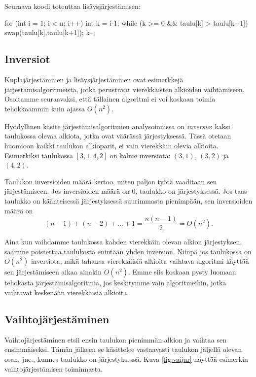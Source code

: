 Seuraava koodi toteuttaa lisäysjärjestämisen:

\begin{code}
for (int i = 1; i < n; i++) {
    int k = i-1;
    while (k >= 0 && taulu[k] > taulu[k+1]) {
        swap(taulu[k],taulu[k+1]);
        k--;
    }
}
\end{code}

\subsection{Inversiot}

Kuplajärjestäminen ja lisäysjärjestäminen ovat esimerkkejä
järjestämis\-algoritmeista, jotka perustuvat vierekkäisten
alkioiden vaihtamiseen.
Osoitamme seuraavaksi, että tällainen algoritmi ei voi koskaan
toimia tehokkaammin kuin ajassa $O(n^2)$.

Hyödyllinen käsite järjestämisalgoritmien analysoinnissa
on \emph{inversio}: kaksi taulukossa olevaa alkiota,
jotka ovat väärässä järjestyksessä.
Tässä otetaan huomioon kaikki taulukon alkioparit,
ei vain vierekkäin olevia alkioita.
Esimerkiksi taulukossa $[3,1,4,2]$ on kolme inversiota:
$(3,1)$, $(3,2)$ ja $(4,2)$.

Taulukon inversioiden määrä kertoo, miten paljon työtä
vaaditaan sen järjestämiseen. Jos inversioiden määrä on 0,
taulukko on järjestyksessä.
Jos taas taulukko on käänteisessä järjestyksessä
suurimmasta pienimpään, sen inversioiden määrä on
\[
(n-1) + (n-2) + \dots + 1 = \frac{n(n-1)}{2} = O(n^2).
\]

Aina kun vaihdamme taulukossa kahden vierekkäin olevan
alkion järjes\-tyksen, saamme poistettua taulukosta enintään
yhden inversion.
Niinpä jos taulukossa on $O(n^2)$ inversiota,
mikä tahansa vierekkäisiä alkioita vaihtava algoritmi
käyttää sen järjestämiseen aikaa ainakin $O(n^2)$.
Emme siis koskaan pysty luomaan tehokasta järjestämisalgoritmia,
jos keskitymme vain algoritmeihin, jotka vaihtavat
keskenään vierekkäisiä alkioita.

\subsection{Vaihtojärjestäminen}

Vaihtojärjestäminen etsii ensin taulukon pienimmän alkion
ja vaihtaa sen ensimmäiseksi.
Tämän jälkeen se käsittelee vastaavasti taulukon
jäljellä olevan osan, jne., kunnes taulukko on järjestyksessä.
Kuva \ref{fig:vaijar} näyttää esimerkin
vaihtojärjestämisen toiminnasta.

